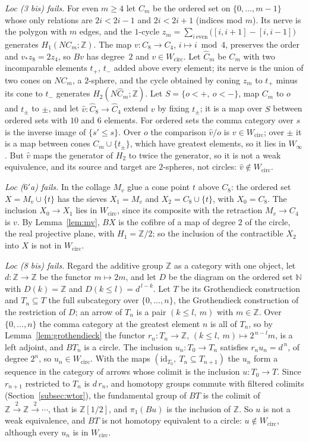 \documentclass[11pt,a4paper]{article}
\theoremstyle{definition}
\newcommand{\Winf}{W_{\infty}}
\newcommand{\Wcirc}{W_{\mathrm{circ}}}
\newcommand{\Z}{\mathbb{Z}}
\newcommand{\N}{\mathbb{N}}
\newcommand{\id}{\mathrm{id}}
\begin{document}
\emph{Loc (3 bis) fails.} For even $m\ge4$ let $C_m$ be the ordered set on $\{0,\dots,m-1\}$
whose only relations are $2i<2i-1$ and $2i<2i+1$ (indices mod $m$). Its nerve is the polygon with
$m$ edges, and the $1$-cycle $z_m=\sum_{i\ \text{even}}\bigl([i,i+1]-[i,i-1]\bigr)$ generates
$H_1(NC_m;\Z)$. The map $v\colon C_8\to C_4$, $i\mapsto i\bmod4$, preserves the order and
$v_*z_8=2z_4$, so $Bv$ has degree~$2$ and $v\in\Wcirc$. Let $\widehat C_m$ be $C_m$ with two
incomparable elements $t_+$, $t_-$ added above every element; its nerve is the union of two
cones on $NC_m$, a $2$-sphere, and the cycle obtained by coning $z_m$ to $t_+$ minus its cone
to $t_-$ generates $H_2(N\widehat C_m;\Z)$. Let $S=\{o<+,\ o<-\}$, map $C_m$ to $o$ and $t_\pm$
to $\pm$, and let $\hat v\colon\widehat C_8\to\widehat C_4$ extend $v$ by fixing $t_\pm$; it
is a map over $S$ between ordered sets with $10$ and $6$ elements. For ordered sets the comma
category over $s$ is the inverse image of $\{s'\le s\}$. Over $o$ the comparison $\hat v/o$ is
$v\in\Wcirc$; over $\pm$ it is a map between cones $C_m\cup\{t_\pm\}$, which have greatest
elements, so it lies in $\Winf$. But $\hat v$ maps the generator of $H_2$ to twice the
generator, so it is not a weak equivalence, and its source and target are $2$-spheres, not
circles: $\hat v\notin\Wcirc$.

\emph{Loc ($6'$a) fails.} In the collage $M_v$ glue a cone point $t$ above $C_8$: the ordered
set $X=M_v\cup\{t\}$ has the sieves $X_1=M_v$ and $X_2=C_8\cup\{t\}$, with $X_0=C_8$. The
inclusion $X_0\to X_1$ lies in $\Wcirc$, since its composite with the retraction $M_v\to C_4$
is $v$. By Lemma~\ref{lem:mv}, $BX$ is the cofibre of a map of degree $2$ of the circle, the
real projective plane, with $H_1=\Z/2$; so the inclusion of the contractible $X_2$ into $X$ is
not in $\Wcirc$.

\emph{Loc (8 bis) fails.} Regard the additive group $\Z$ as a category with one object, let
$d\colon\Z\to\Z$ be the functor $m\mapsto 2m$, and let $D$ be the diagram on the ordered set
$\N$ with $D(k)=\Z$ and $D(k\le l)=d^{\,l-k}$. Let $T$ be its Grothendieck construction and
$T_n\subseteq T$ the full subcategory over $\{0,\dots,n\}$, the Grothendieck construction of the
restriction of $D$; an arrow of $T_n$ is a pair $(k\le l,\ m)$ with $m\in\Z$. Over
$\{0,\dots,n\}$ the comma category at the greatest element $n$ is all of $T_n$, so by
Lemma~\ref{lem:grothendieck} the functor $r_n\colon T_n\to\Z$,
$(k\le l,\ m)\mapsto 2^{\,n-l}m$, is a left adjoint, and $BT_n$ is a circle. The inclusion
$u_n\colon T_0\to T_n$ satisfies $r_nu_n=d^{\,n}$, of degree $2^n$, so $u_n\in\Wcirc$. With
the maps $(\id_{T_0},\ T_n\subseteq T_{n+1})$ the $u_n$ form a sequence in the category of
arrows whose colimit is the inclusion $u\colon T_0\to T$. Since $r_{n+1}$ restricted to $T_n$ is
$d\,r_n$, and homotopy groups commute with filtered colimits (Section~\ref{subsec:wtor}), the
fundamental group of $BT$ is the colimit of $\Z\xrightarrow{2}\Z\xrightarrow{2}\cdots$, that is
$\Z[1/2]$, and $\pi_1(Bu)$ is the inclusion of $\Z$. So $u$ is not a weak equivalence, and $BT$
is not homotopy equivalent to a circle: $u\notin\Wcirc$, although every $u_n$ is in $\Wcirc$.
\end{document}
